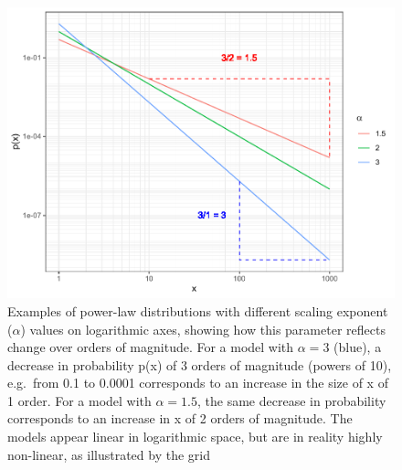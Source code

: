 \documentclass[
  12pt,
  a4paper, twoside]{book}
\begin{document}
\begin{figure}

{\centering \includegraphics[width=0.9\linewidth]{bookdown-demo_files/figure-latex/04-pl-1} 

}

\caption[Power laws and scaling exponents]{Examples of power-law distributions with different scaling exponent (\(\alpha\)) values on logarithmic axes, showing how this parameter reflects change over orders of magnitude. For a model with \(\alpha = 3\) (blue), a decrease in probability p(x) of 3 orders of magnitude (powers of 10), e.g.~from 0.1 to 0.0001 corresponds to an increase in the size of x of 1 order. For a model with \(\alpha = 1.5\), the same decrease in probability corresponds to an increase in x of 2 orders of magnitude. The models appear linear in logarithmic space, but are in reality highly non-linear, as illustrated by the grid}\label{fig:04-pl}
\end{figure}
\end{document}
